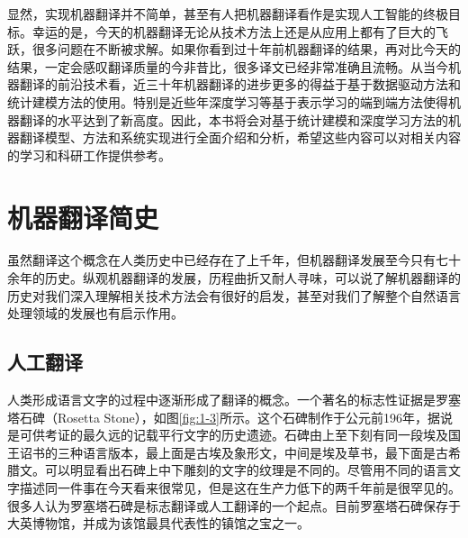 \parinterval 显然，实现机器翻译并不简单，甚至有人把机器翻译看作是实现人工智能的终极目标。幸运的是，今天的机器翻译无论从技术方法上还是从应用上都有了巨大的飞跃，很多问题在不断被求解。如果你看到过十年前机器翻译的结果，再对比今天的结果，一定会感叹翻译质量的今非昔比，很多译文已经非常准确且流畅。从当今机器翻译的前沿技术看，近三十年机器翻译的进步更多的得益于基于数据驱动方法和统计建模方法的使用。特别是近些年深度学习等基于表示学习的端到端方法使得机器翻译的水平达到了新高度。因此，本书将会对基于统计建模和深度学习方法的机器翻译模型、方法和系统实现进行全面介绍和分析，希望这些内容可以对相关内容的学习和科研工作提供参考。


\sectionnewpage
\section{机器翻译简史}

\parinterval 虽然翻译这个概念在人类历史中已经存在了上千年，但机器翻译发展至今只有七十余年的历史。纵观机器翻译的发展，历程曲折又耐人寻味，可以说了解机器翻译的历史对我们深入理解相关技术方法会有很好的启发，甚至对我们了解整个自然语言处理领域的发展也有启示作用。


\subsection{人工翻译}

\parinterval 人类形成语言文字的过程中逐渐形成了翻译的概念。一个著名的标志性证据是罗塞塔石碑（Rosetta Stone），如图\ref{fig:1-3}所示。这个石碑制作于公元前196年，据说是可供考证的最久远的记载平行文字的历史遗迹。石碑由上至下刻有同一段埃及国王诏书的三种语言版本，最上面是古埃及象形文，中间是埃及草书，最下面是古希腊文。可以明显看出石碑上中下雕刻的文字的纹理是不同的。尽管用不同的语言文字描述同一件事在今天看来很常见，但是这在生产力低下的两千年前是很罕见的。很多人认为罗塞塔石碑是标志翻译或人工翻译的一个起点。目前罗塞塔石碑保存于大英博物馆，并成为该馆最具代表性的镇馆之宝之一。

